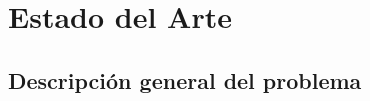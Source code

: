 \chapter{Estado del Arte}
\label{chapter:Estado del Arte}


\section{Descripción general del problema}

